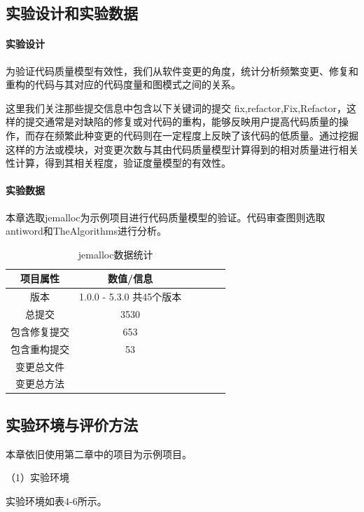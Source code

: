 \subsection{实验设计和实验数据}

\paragraph{实验设计} 为验证代码质量模型有效性，我们从软件变更的角度，统计分析频繁变更、修复和重构的代码与其对应的代码度量和图模式之间的关系。

这里我们关注那些提交信息中包含以下关键词的提交 {fix,refactor,Fix,Refactor}，这样的提交通常是对缺陷的修复或对代码的重构，能够反映用户提高代码质量的操作，而存在频繁此种变更的代码则在一定程度上反映了该代码的低质量。通过挖掘这样的方法或模块，对变更次数与其由代码质量模型计算得到的相对质量进行相关性计算，得到其相关程度，验证度量模型的有效性。

\paragraph{实验数据} 本章选取jemalloc为示例项目进行代码质量模型的验证。代码审查图则选取antiword和TheAlgorithms进行分析。

\begin{table}[htbp]
\caption{jemalloc数据统计}
\vspace{0.5em}\centering\wuhao
\begin{tabular}{cccccc}
\toprule
项目属性 & 数值/信息 \\
\midrule
版本 & 1.0.0 - 5.3.0 共45个版本 \\
总提交 & 3530 \\
包含修复提交 & 653  \\
包含重构提交 & 53  \\
变更总文件 &  \\
变更总方法 &   \\
\bottomrule
\end{tabular}
\end{table}


\subsection{实验环境与评价方法}

本章依旧使用第二章中的项目为示例项目。

（1）实验环境

实验环境如表4-6所示。

